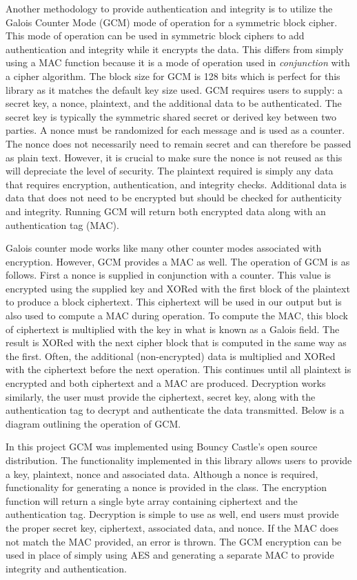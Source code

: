 Another methodology to provide authentication and integrity is to utilize the Galois Counter Mode (GCM) mode of operation for a symmetric block cipher. This mode of operation can be used in symmetric block ciphers to add authentication and integrity while it encrypts the data. This differs from simply using a MAC function because it is a mode of operation used in \textit{conjunction} with a cipher algorithm. The block size for GCM is 128 bits which is perfect for this library as it matches the default key size used. GCM requires users to supply: a secret key, a nonce, plaintext, and the additional data to be authenticated. The secret key is typically the symmetric shared secret or derived key between two parties. A nonce must be randomized for each message and is used as a counter. The nonce does not necessarily need to remain secret and can therefore be passed as plain text. However, it is crucial to make sure the nonce is not reused as this will depreciate the level of security. The plaintext required is simply any data that requires encryption, authentication, and integrity checks. Additional data is data that does not need to be encrypted but should be checked for authenticity and integrity. Running GCM will return both encrypted data along with an authentication tag (MAC). 

Galois counter mode works like many other counter modes associated with encryption. However, GCM provides a MAC as well. The operation of GCM is as follows. First a nonce is supplied in conjunction with a counter. This value is encrypted using the supplied key and XORed with the first block of the plaintext to produce a block ciphertext. This ciphertext will be used in our output but is also used to compute a MAC during operation. To compute the MAC, this block of ciphertext is multiplied with the key in what is known as a Galois field. The result is XORed with the next cipher block that is computed in the same way as the first. Often, the additional (non-encrypted) data is multiplied and XORed with the ciphertext before the next operation. This continues until all plaintext is encrypted and both ciphertext and a MAC are produced.  Decryption works similarly, the user must provide the ciphertext, secret key,  along with the authentication tag to decrypt and authenticate the data transmitted. Below is a diagram outlining the operation of GCM. 

In this project GCM was implemented using Bouncy Castle's open source distribution. The functionality implemented in this library allows users to provide a key, plaintext, nonce and associated data. Although a nonce is required, functionality for generating a nonce is provided in the class. The encryption function will return a single byte array containing ciphertext and the authentication tag. Decryption is simple to use as well, end users must provide the proper secret key, ciphertext, associated data, and nonce. If the MAC does not match the MAC provided, an error is thrown. The GCM encryption can be used in place of simply using AES and generating a separate MAC to provide integrity and authentication. 

